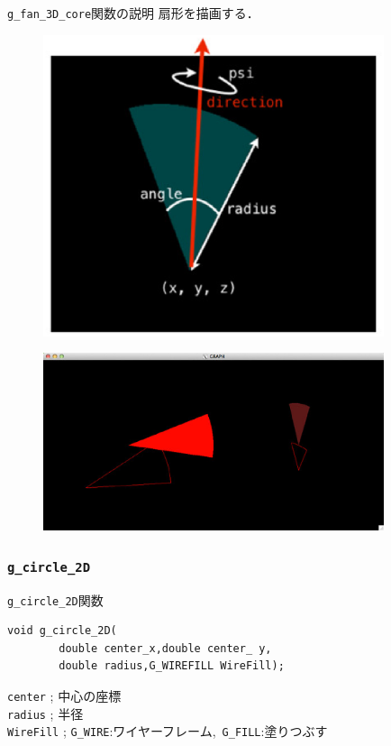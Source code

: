 \documentclass[a4paper,12pt]{jsarticle}%
\begin{document}
\begin{itembox}[l]{\texttt{g\_fan\_3D\_core}関数の説明}
扇形を描画する．
\end{itembox}
\begin{figure}[htb]
	\includegraphics[width=100mm]{./Figures/eps/Canvas_g_fan.eps}
\end{figure}

\begin{figure}[htb]
	\includegraphics[width=100mm]{./Figures/eps/Canvas_g_fan2.eps}
\end{figure}




\clearpage
\subsubsection{\texttt{g\_circle\_2D}}

\begin{itembox}[l]{\texttt{g\_circle\_2D}関数}
\begin{verbatim}
void g_circle_2D(
        double center_x,double center_ y,
        double radius,G_WIREFILL WireFill);
\end{verbatim}
\verb|center| ; 中心の座標\\
\verb|radius| ; 半径\\
\verb|WireFill| ; \verb|G_WIRE|:ワイヤーフレーム,\ \verb|G_FILL|:塗りつぶす \\
\end{itembox}
\end{document}
